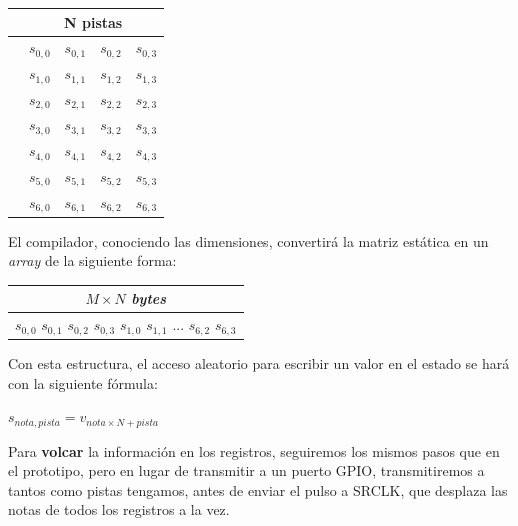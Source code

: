 \begin{center}
	\begin{tabular}{|c|cccc|}
		\hline & \multicolumn{4}{c|}{N pistas} \\
		\hline \multirow{7}{*}{\rotatebox[]{90}{M notas}} & $s_{0,0}$ & $s_{0,1}$ & $s_{0,2}$ & $s_{0,3}$ \\
		& $s_{1,0}$ & $s_{1,1}$ & $s_{1,2}$ & $s_{1,3}$ \\
		& $s_{2,0}$ & $s_{2,1}$ & $s_{2,2}$ & $s_{2,3}$ \\
		& $s_{3,0}$ & $s_{3,1}$ & $s_{3,2}$ & $s_{3,3}$ \\
		& $s_{4,0}$ & $s_{4,1}$ & $s_{4,2}$ & $s_{4,3}$ \\
		& $s_{5,0}$ & $s_{5,1}$ & $s_{5,2}$ & $s_{5,3}$ \\
		& $s_{6,0}$ & $s_{6,1}$ & $s_{6,2}$ & $s_{6,3}$ \\
		\hline 
	\end{tabular}
	\smallskip
\end{center}

\smallskip

El compilador, conociendo las dimensiones, convertirá la matriz estática en un \textit{array} de la siguiente forma:

\smallskip

\begin{center}
	\begin{tabular}{|c|}
		\hline $M\times N$ \textit{bytes} \\
		\hline $s_{0,0}$ $s_{0,1}$ $s_{0,2}$ $s_{0,3}$ $s_{1,0}$ $s_{1,1}$ ... $s_{6,2}$  $s_{6,3}$ \\
		\hline 
	\end{tabular}
	\smallskip
\end{center}

\smallskip

Con esta estructura, el acceso aleatorio para escribir un valor en el estado se hará con la siguiente fórmula:

\begin{center}
	$s_{nota,pista} = v_{nota \times N + pista}$
\end{center}

Para \textbf{volcar} la información en los registros, seguiremos los mismos pasos que en el prototipo, pero en lugar de transmitir a un puerto \acrshort{GPIO}, transmitiremos a tantos como pistas tengamos, antes de enviar el pulso a SRCLK, que desplaza las notas de todos los registros a la vez.

